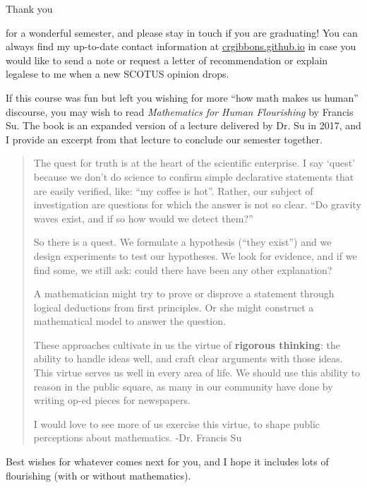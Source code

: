 \documentclass[12pt,addpoints]{exam}
\begin{document}
\bigskip

\begin{huge}Thank you\end{huge} for a wonderful semester, and please stay in touch if you are graduating! You can always find my up-to-date contact information at \href{https://crgibbons.github.io}{crgibbons.github.io} in case you would like to send a note or request a letter of recommendation or explain legalese to me when a new SCOTUS opinion drops.

If this course was fun but left you wishing for more ``how math makes us human'' discourse, you may wish to read \textit{Mathematics for Human Flourishing} by Francis Su. The book is an expanded version of a lecture delivered by Dr. Su in 2017, and I provide an excerpt from that lecture to conclude our semester together.

\begin{large}
\begin{quote}
The quest for truth is at the heart of the scientific enterprise.  I say `quest' because we don't do science to confirm simple declarative statements that are easily verified, like: ``my coffee is hot''.  Rather, our subject of investigation are questions for which the answer is not so clear.  ``Do gravity waves exist, and if so how would we detect them?''

So there is a quest.  We formulate a hypothesis (``they exist'') and we design experiments to test our hypotheses.  We look for evidence, and if we find some, we still ask: could there have been any other explanation?   

A mathematician might try to prove or disprove a statement through logical deductions from first principles. Or she might construct a mathematical model to answer the question. 

These approaches cultivate in us the virtue of \textbf{rigorous thinking}: the ability to handle ideas well, and craft clear arguments with those ideas.  This virtue serves us well in every area of life.  We should use this ability to reason in the public square, as many in our community have done by writing op-ed pieces for newspapers.

I would love to see more of us exercise this virtue, to shape public perceptions about mathematics. \hfill -Dr. Francis Su
\end{quote}
\end{large}
\vfill

\noindent Best wishes for whatever comes next for you, and I hope it includes lots of flourishing (with or without mathematics).
\end{document}
